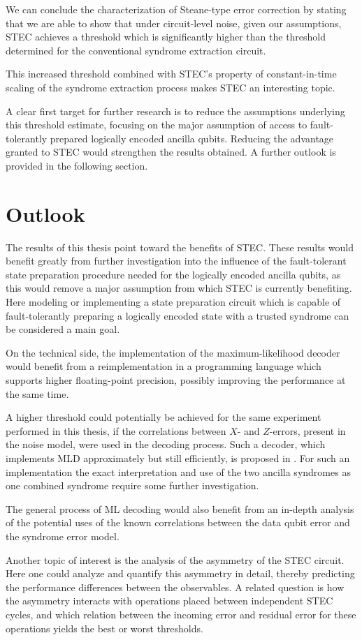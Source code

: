We can conclude the characterization of Steane-type error correction by stating that we are able to show
that under circuit-level noise, given our assumptions, 
STEC achieves a threshold which is significantly higher than  
the threshold determined for the conventional syndrome extraction circuit.

This increased threshold combined with STEC's property of constant-in-time scaling of the syndrome extraction process
makes STEC an interesting topic. 

A clear first target for further research is to reduce the assumptions underlying this threshold estimate, 
focusing on the major assumption of access to fault-tolerantly prepared logically encoded ancilla qubits.
Reducing the advantage granted to STEC would strengthen the results obtained.
A further outlook is provided in the following section. 

\section{Outlook}\label{sec:outlook}

The results of this thesis point toward the benefits of STEC.
These results would benefit greatly from further investigation into the influence of the fault-tolerant state preparation procedure 
needed for the logically encoded ancilla qubits, as this would remove a major assumption from which STEC is currently benefiting.
Here modeling or implementing a state preparation circuit which is capable of fault-tolerantly preparing a logically encoded state 
with a trusted syndrome can be considered a main goal.

On the technical side, the implementation of the maximum-likelihood decoder would benefit from a reimplementation in a programming  
language which supports higher floating-point precision, possibly improving the performance at the same time. 

A higher threshold could potentially be achieved for the same experiment performed in this thesis, 
if the correlations between $X$- and $Z$-errors, present in the noise model, were used in the decoding process.
Such a decoder, which implements MLD approximately but still efficiently, is proposed in \cite{efficient_decoding_algorithm}.
For such an implementation the exact interpretation and use of the two ancilla syndromes as one combined syndrome require some further investigation. 

The general process of ML decoding would also benefit from an in-depth analysis of the potential uses of the known correlations 
between the data qubit error and the syndrome error model.

Another topic of interest is the analysis of the asymmetry of the STEC circuit.
Here one could analyze and quantify this asymmetry in detail, thereby predicting the performance differences between the observables. 
A related question is how the asymmetry interacts with operations placed between independent STEC cycles, 
and which relation between the incoming error and residual error for these operations yields the best or worst thresholds. 

